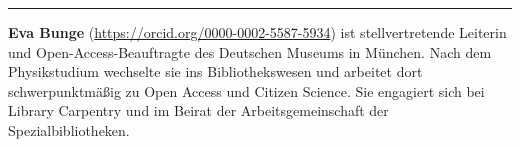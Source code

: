 \begin{center}\rule{0.5\linewidth}{0.5pt}\end{center}

\textbf{Eva Bunge} (\url{https://orcid.org/0000-0002-5587-5934}) ist stellvertretende Leiterin und
Open-Access-Beauftragte des Deutschen Museums in München. Nach dem
Physikstudium wechselte sie ins Bibliothekswesen und arbeitet dort
schwerpunktmäßig zu Open Access und Citizen Science. Sie engagiert sich
bei Library Carpentry und im Beirat der Arbeitsgemeinschaft der
Spezialbibliotheken.
